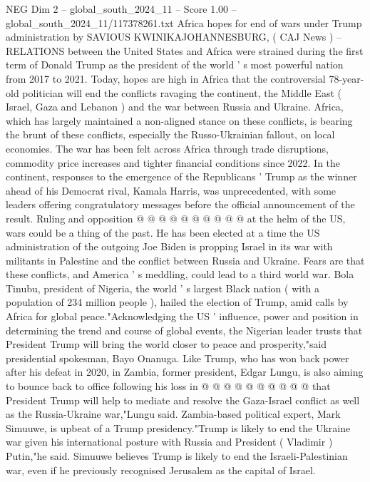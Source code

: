 \begin{textsample}{NEG Dim 2 – global\_south\_2024\_11 – Score 1.00 – global\_south\_2024\_11/117378261.txt}  \label{ex:f2_neg_208}
Africa hopes for end of wars under Trump administration by SAVIOUS KWINIKAJOHANNESBURG, ( CAJ News ) -- RELATIONS between the United States and Africa were strained during the first term of Donald Trump as the president of the world ' s most powerful nation from 2017 to 2021.
Today, hopes are high in Africa that the controversial 78-year-old politician will end the conflicts ravaging the continent, the Middle East ( Israel, Gaza and Lebanon ) and the war between Russia and Ukraine.
Africa, which has largely maintained a non-aligned stance on these conflicts, is bearing the brunt of these conflicts, especially the Russo-Ukrainian fallout, on local economies.
The war has been felt across Africa through trade disruptions, commodity price increases and tighter financial conditions since 2022.
In the continent, responses to the emergence of the Republicans ' Trump as the winner ahead of his Democrat rival, Kamala Harris, was unprecedented, with some leaders offering congratulatory messages before the official announcement of the result.
Ruling and opposition @ @ @ @ @ @ @ @ @ @ at the helm of the US, wars could be a thing of the past.
He has been elected at a time the US administration of the outgoing Joe Biden is propping Israel in its war with militants in Palestine and the conflict between Russia and Ukraine.
Fears are that these conflicts, and America ' s meddling, could lead to a third world war.
Bola Tinubu, president of Nigeria, the world ' s largest Black nation ( with a population of 234 million people ), hailed the election of Trump, amid calls by Africa for global peace."Acknowledging the US ' influence, power and position in determining the trend and course of global events, the Nigerian leader trusts that President Trump will bring the world closer to peace and prosperity,"said presidential spokesman, Bayo Onanuga.
Like Trump, who has won back power after his defeat in 2020, in Zambia, former president, Edgar Lungu, is also aiming to bounce back to office following his loss in @ @ @ @ @ @ @ @ @ @ that President Trump will help to mediate and resolve the Gaza-Israel conflict as well as the Russia-Ukraine war,"Lungu said.
Zambia-based political expert, Mark Simuuwe, is upbeat of a Trump presidency."Trump is likely to end the Ukraine war given his international posture with Russia and President ( Vladimir ) Putin,"he said.
Simuuwe believes Trump is likely to end the Israeli-Palestinian war, even if he previously recognised Jerusalem as the capital of Israel.

\end{textsample}
